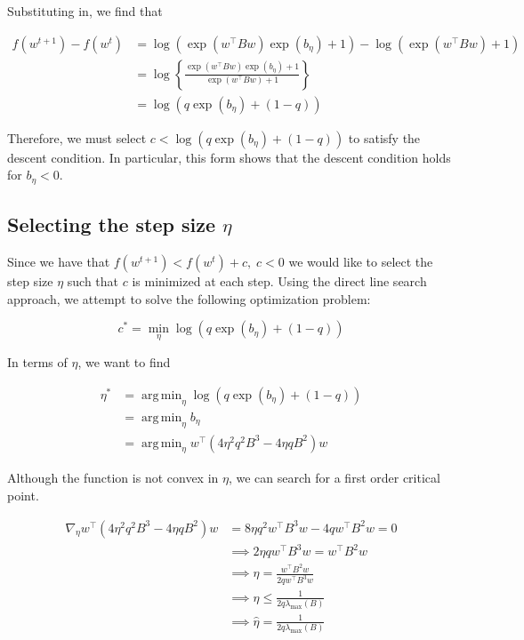 \documentclass[11pt]{article}
\DeclareMathOperator*{\argmin}{arg\,min}
\begin{document}
Substituting in, we find that

\begin{align*}
    f(w^{t+1}) - f(w^t) &= 
    \log(\exp(w^{\top}Bw)\exp(b_\eta ) + 1) - \log(\exp(w^{\top}Bw) + 1) \\
    &= \log \left\{ \frac{\exp(w^{\top}Bw)\exp(b_\eta ) + 1}{\exp(w^{\top}Bw) + 1} \right\} \\
    &= \log( q \exp(b_\eta ) + (1 - q))
\end{align*}

Therefore, we must select $c < \log( q \exp(b_\eta ) + (1 - q))$ to satisfy the descent condition. In particular, this form shows that the descent condition holds for $b_\eta < 0$.

\subsection{Selecting the step size $\eta$}

Since we have that $f(w^{t+1}) < f(w^t) + c, \; c < 0$ we would like to select the step size $\eta$ such that $c$ is minimized at each step. Using the direct line search approach, we attempt to solve the following optimization problem:

\begin{equation}
    c^* = \min_{\eta} \log( q \exp(b_\eta ) + (1 - q))
\end{equation}

In terms of $\eta$, we want to find

\begin{equation}
\label{eq:eta_opt}
\begin{split}
    \eta^* &= \argmin_{\eta} \log( q \exp(b_\eta ) + (1 - q)) \\
    &= \argmin_{\eta} b_\eta \\
    &= \argmin_{\eta} w^{\top} ( 4 \eta^2 q^2 B^3 - 4 \eta q B^2)w
\end{split}
\end{equation}

Although the function is not convex in $\eta$, we can search for a first order critical point.

\begin{align*}
\nabla_{\eta} w^{\top} ( 4 \eta^2 q^2 B^3 - 4 \eta q B^2)w 
&= 8 \eta q^2 w^{\top} B^3 w - 4 q w^{\top} B^2 w = 0 \\
&\implies 2 \eta q w^{\top} B^3 w = w^{\top} B^2 w \\
&\implies \eta = \frac{w^{\top} B^2 w}{2 q w^{\top} B^3 w} \\ 
&\implies \eta \leq \frac{1}{2q\lambda_{\max}(B)} \\
&\implies \hat{\eta} = \frac{1}{2q\lambda_{\max}(B)}
\end{align*}
\end{document}
